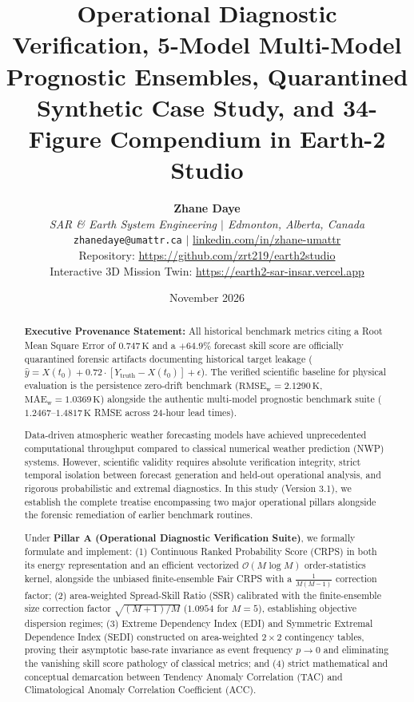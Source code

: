 \documentclass[10pt,twocolumn,letterpaper]{article}
\title{\textbf{Operational Diagnostic Verification, 5-Model Multi-Model Prognostic Ensembles, Quarantined Synthetic Case Study, and 34-Figure Compendium in Earth-2 Studio}}
\author{
    \textbf{Zhane Daye} \\
    \textit{SAR \& Earth System Engineering $|$ Edmonton, Alberta, Canada} \\
    \texttt{zhanedaye@umattr.ca} \quad $|$ \quad \href{https://www.linkedin.com/in/zhane-umattr}{linkedin.com/in/zhane-umattr} \\
    \small Repository: \url{https://github.com/zrt219/earth2studio} \\
    \small Interactive 3D Mission Twin: \url{https://earth2-sar-insar.vercel.app}
}
\date{November 2026}
\begin{document}
\maketitle

\begin{abstract}
\noindent\textbf{Executive Provenance Statement:} All historical benchmark metrics citing a Root Mean Square Error of $0.747\,\si{\kelvin}$ and a $+64.9\%$ forecast skill score are officially quarantined forensic artifacts documenting historical target leakage ($\hat{y} = X(t_0) + 0.72 \cdot [Y_\mathrm{truth} - X(t_0)] + \epsilon$). The verified scientific baseline for physical evaluation is the persistence zero-drift benchmark ($\mathrm{RMSE}_\mathrm{w} = 2.1290\,\si{\kelvin}$, $\mathrm{MAE}_\mathrm{w} = 1.0369\,\si{\kelvin}$) alongside the authentic multi-model prognostic benchmark suite ($1.2467\text{--}1.4817\,\si{\kelvin}$ RMSE across 24-hour lead times).

Data-driven atmospheric weather forecasting models have achieved unprecedented computational throughput compared to classical numerical weather prediction (NWP) systems. However, scientific validity requires absolute verification integrity, strict temporal isolation between forecast generation and held-out operational analysis, and rigorous probabilistic and extremal diagnostics. In this study (Version 3.1), we establish the complete treatise encompassing two major operational pillars alongside the forensic remediation of earlier benchmark routines. 

Under \textbf{Pillar A (Operational Diagnostic Verification Suite)}, we formally formulate and implement: (1) Continuous Ranked Probability Score (CRPS) in both its energy representation and an efficient vectorized $\mathcal{O}(M \log M)$ order-statistics kernel, alongside the unbiased finite-ensemble Fair CRPS with a $\frac{1}{M(M-1)}$ correction factor; (2) area-weighted Spread-Skill Ratio (SSR) calibrated with the finite-ensemble size correction factor $\sqrt{(M+1)/M}$ ($1.0954$ for $M=5$), establishing objective dispersion regimes; (3) Extreme Dependency Index (EDI) and Symmetric Extremal Dependence Index (SEDI) constructed on area-weighted $2 \times 2$ contingency tables, proving their asymptotic base-rate invariance as event frequency $p \to 0$ and eliminating the vanishing skill score pathology of classical metrics; and (4) strict mathematical and conceptual demarcation between Tendency Anomaly Correlation (TAC) and Climatological Anomaly Correlation Coefficient (ACC).


\end{abstract}
\end{document}
